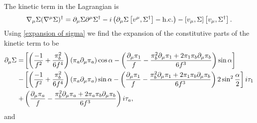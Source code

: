 The kinetic term in the \chpt Lagrangian is
\begin{equation}
    \nabla_\mu \Sigma (\nabla^\mu \Sigma)^\dagger 
    = \partial_\mu \Sigma \partial^\mu \Sigma^\dagger 
    - i \left(\partial_\mu \Sigma \left[v^\mu, \Sigma^\dagger \right] - \mathrm{h.c.} \right)
    - \left[v_\mu, \Sigma \right]\left[v_\mu, \Sigma^\dagger \right].
    \label{kinetic term}
\end{equation}
Using \autoref{expansion of sigma} we find the expansion of the constitutive parts of the kinetic term to be
\begin{align}
    \notag
    \partial_\mu \Sigma 
    = &
    \left[
        \left(
            \frac{-1}{f^2}
            + \frac{\pi_b^2}{6f^4}
        \right)
        (\pi_a \partial_\mu \pi_a)
        \cos{\alpha}
        - 
        \left(
            \frac{\partial_\mu \pi_1}{f} 
            - \frac{\pi_b^2 \partial_\mu\pi_1
            + 2 \pi_1 \pi_b \partial_\mu\pi_b}{6f^3} 
        \right)
        \sin{\alpha}
    \right]
    \\ \notag 
    - &
    \left[
        \left(
            \frac{-1}{f^2}
            + \frac{\pi_b^2}{6f^4}
        \right)
        (\pi_a \partial_\mu \pi_a)
        \sin{\alpha}
        - \left(
        \frac{\partial_\mu \pi_1}{f} 
        - \frac{\pi_b^2 \partial_\mu\pi_1
        + 2 \pi_1 \pi_b \partial_\mu\pi_b}{6f^3}
        \right)
        2 \sin^2{\frac{\alpha}{2}}
    \right]
    i \tau_1 \\ \label{Sigma derivative}
    +& 
    \left(
        \frac{\partial_\mu \pi_a}{f} 
        - \frac{\pi_b^2 \partial_\mu\pi_a 
        + 2 \pi_a \pi_b \partial_\mu\pi_b}{6f^3} 
    \right)
    i \tau_a,
\end{align}
and
